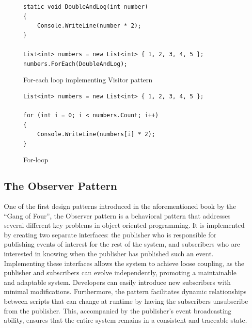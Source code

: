 \begin{figure}[!ht]
    \begin{lstlisting}[style=csharp]
static void DoubleAndLog(int number)
{
    Console.WriteLine(number * 2);
}

List<int> numbers = new List<int> { 1, 2, 3, 4, 5 };
numbers.ForEach(DoubleAndLog);
    \end{lstlisting}
    \caption{For-each loop implementing Visitor pattern}
    \label{fig:visitor-pattern-example}
\end{figure}

\begin{figure}[!ht]
    \begin{lstlisting}[style=csharp]
List<int> numbers = new List<int> { 1, 2, 3, 4, 5 };

for (int i = 0; i < numbers.Count; i++)
{
    Console.WriteLine(numbers[i] * 2);
}
    \end{lstlisting}
    \caption{For-loop}
    \label{fig:for-loop-example}
\end{figure}

\subsection{The Observer Pattern}
One of the first design patterns introduced in the aforementioned book by the “Gang of Four”, the Observer pattern is a behavioral pattern that addresses several different key problems in object-oriented programming. It is implemented by creating two separate interfaces: the publisher who is responsible for publishing events of interest for the rest of the system, and subscribers who are interested in knowing when the publisher has published such an event. Implementing these interfaces allows the system to achieve loose coupling, as the publisher and subscribers can evolve independently, promoting a maintainable and adaptable system. Developers can easily introduce new subscribers with minimal modifications. Furthermore, the pattern facilitates dynamic relationships between scripts that can change at runtime by having the subscribers unsubscribe from the publisher. This, accompanied by the publisher's event broadcasting ability, ensures that the entire system remains in a consistent and traceable state. 

